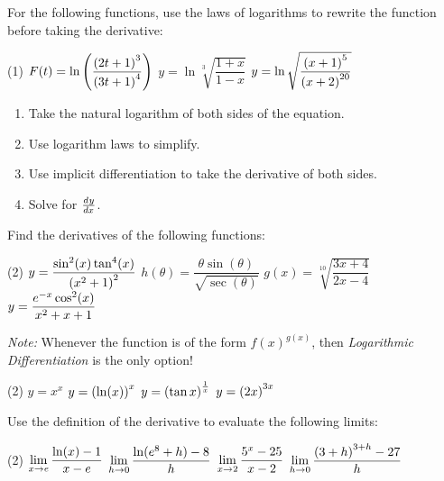 \documentclass[mathNotesPreamble]{subfiles}
\begin{document}
  \begin{ex*}
    For the following functions, use the laws of logarithms to rewrite the function before taking the derivative:
  \end{ex*}
  
  \noindent
  \begin{tasks}[after-item-skip=\stretch{1}, label=~](1)
    \task $F(t)=\ln\parens{\dfrac{\parens{2t+1}^3}{\parens{3t+1}^4}}$
    \task $y=\ln\sqrt[3]{\dfrac{1+x}{1-x}}$
    \task $y=\ln\sqrt{\dfrac{\parens{x+1}^5}{\parens{x+2}^{20}}}$
  \end{tasks}
  \pagebreak

  \begin{thmBox*}
    \begin{enumerate}
      \item Take the natural logarithm of both sides of the equation.
      \item Use logarithm laws to simplify.
      \item Use implicit differentiation to take the derivative of both sides.
      \item Solve for $\dydx$.
    \end{enumerate}
  \end{thmBox*}

  \begin{ex*}
    Find the derivatives of the following functions:
  \end{ex*}
  \begin{tasks}[after-item-skip=\stretch{1}, label=~](2)
    \task $y=\dfrac{\sin^2(x)\tan^4(x)}{\parens{x^2+1}^2}$
    \task $h(\theta)=\dfrac{\theta \sin(\theta)}{\sqrt{\sec(\theta)}}$
    \task $g(x)=\sqrt[10]{\dfrac{3x+4}{2x-4}}$
    \task $y=\dfrac{e\inv[x]\cos^2(x)}{x^2+x+1}$
  \end{tasks}
  \pagebreak
  
  \noindent
  \textit{Note:} Whenever the function is of the form $f(x)^{g(x)}$, then \textit{Logarithmic Differentiation} is the only option!
  \begin{tasks}[after-item-skip=\stretch{1}, label=~](2)
    \task $y=x^x$
    \task $y=\parens{\ln(x)}^x$
    \task $y=\parens{\tan x}^\frac{1}{x}$
    \task $y=\parens{2x}^{3x}$
  \end{tasks}
  \vfill 
  \pagebreak
  
  \begin{ex*}
    Use the definition of the derivative to evaluate the following limits:
  \end{ex*}
  \begin{tasks}[after-item-skip=\stretch{1}, label=~](2)
    \task $\ds\lim_{x\to e} \dfrac{\ln(x)-1}{x-e}$
    \task $\ds\lim_{h\to 0} \dfrac{\ln(e^8+h)-8}{h}$
    \task $\ds\lim_{x\to 2} \dfrac{5^x-25}{x-2}$
    \task $\ds\lim_{h\to 0} \dfrac{\parens{3+h}^{3+h}-27}{h}$
  \end{tasks}
  \vfill
  \pagebreak
  
\end{document}
